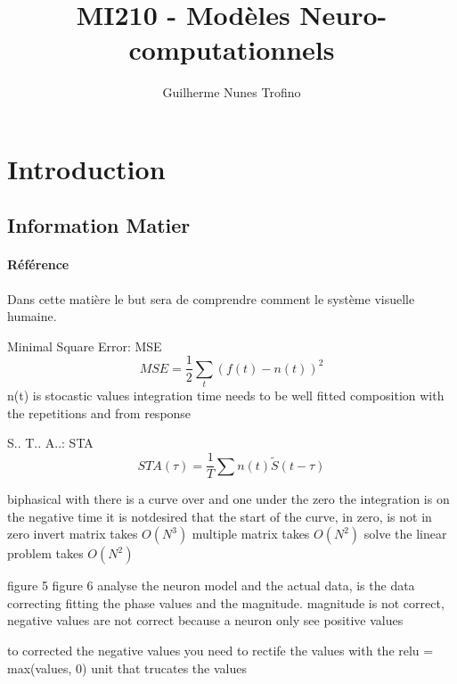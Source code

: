 \documentclass{article}
\title{MI210 - Modèles Neuro-computationnels}
\author{Guilherme Nunes Trofino}
\begin{document}
\maketitle
\setlength{\parindent}{0pt}

\newpage\tableofcontents

\section{Introduction}

% 
% 
% 

\subsection{Information Matier}
\paragraph{Référence}Dans cette matière le but sera de comprendre comment le système visuelle humaine.

Minimal Square Error: MSE
\begin{equation}
    MSE = \frac{1}{2} \sum_{t}(f(t) - n(t))^2
\end{equation}
n(t) is stocastic values
integration time needs to be well fitted
composition with the repetitions and from response

S.. T.. A..: STA
\begin{equation}
    STA(\tau) = \frac{1}{T} \sum n(t) \tilde{S}(t -\tau)
\end{equation}

biphasical with there is a curve over and one under the zero
the integration is on the negative time
it is notdesired that the start of the curve, in zero, is not in zero
invert matrix takes $O(N^3)$
multiple matrix takes $O(N^2)$
solve the linear problem takes $O(N^2)$


figure 5 figure 6
analyse the neuron model and the actual data, is the data correcting fitting the phase values and the magnitude. magnitude is not correct, negative values are not correct because a neuron only see positive values

to corrected the negative values you need to rectife the values with the relu = max(values, 0) unit that trucates the values
\end{document}
